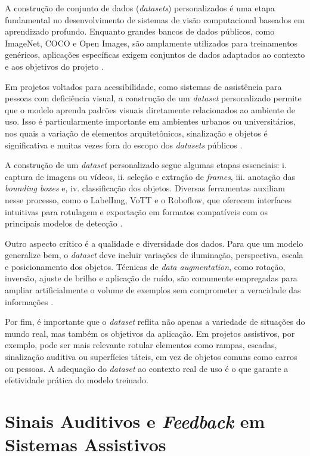 A construção de conjunto de dados (\textit{datasets}) personalizados é uma etapa fundamental no desenvolvimento de sistemas de visão computacional baseados em aprendizado profundo. Enquanto grandes bancos de dados públicos, como ImageNet, COCO e Open Images, são amplamente utilizados para treinamentos genéricos, aplicações específicas exigem conjuntos de dados adaptados ao contexto e aos objetivos do projeto \cite{Zhou2017}.

Em projetos voltados para acessibilidade, como sistemas de assistência para pessoas com deficiência visual, a construção de um \textit{dataset} personalizado permite que o modelo aprenda padrões visuais diretamente relacionados ao ambiente de uso. Isso é particularmente importante em ambientes urbanos ou universitários, nos quais a variação de elementos arquitetônicos, sinalização e objetos é significativa e muitas vezes fora do escopo dos \textit{datasets} públicos \cite{Khan2021}.

A construção de um \textit{dataset} personalizado segue algumas etapas essenciais: i. captura de imagens ou vídeos, ii. seleção e extração de \textit{frames}, iii. anotação das \textit{bounding boxes} e, iv. classificação dos objetos. Diversas ferramentas auxiliam nesse processo, como o LabelImg, VoTT e o Roboflow, que oferecem interfaces intuitivas para rotulagem e exportação em formatos compatíveis com os principais modelos de detecção \cite{Tzutalin2015}.

Outro aspecto crítico é a qualidade e diversidade dos dados. Para que um modelo generalize bem, o \textit{dataset} deve incluir variações de iluminação, perspectiva, escala e posicionamento dos objetos. Técnicas de \textit{data augmentation}, como rotação, inversão, ajuste de brilho e aplicação de ruído, são comumente empregadas para ampliar artificialmente o volume de exemplos sem comprometer a veracidade das informações \cite{Shorten2019}.

Por fim, é importante que o \textit{dataset} reflita não apenas a variedade de situações do mundo real, mas também os objetivos da aplicação. Em projetos assistivos, por exemplo, pode ser mais relevante rotular elementos como rampas, escadas, sinalização auditiva ou superfícies táteis, em vez de objetos comuns como carros ou pessoas. A adequação do \textit{dataset} ao contexto real de uso é o que garante a efetividade prática do modelo treinado.

\section{\textbf{Sinais Auditivos e \textit{Feedback} em Sistemas Assistivos}}

